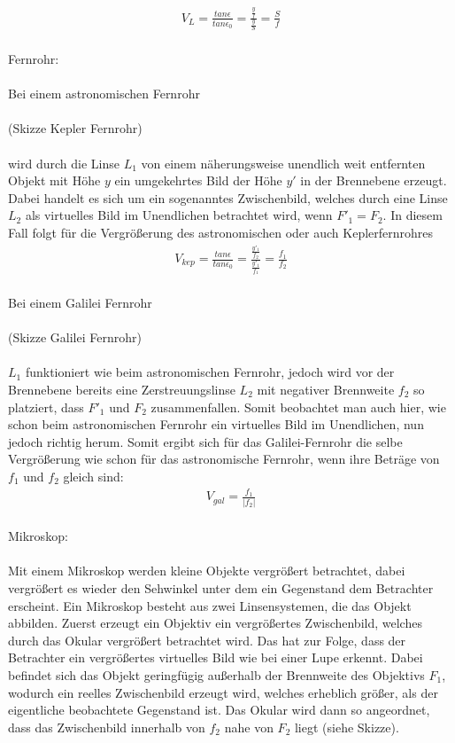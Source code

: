 \documentclass[a4paper,10pt]{scrartcl}
\begin{document}
			\begin{align*}
			V_{L}=\frac{tan\epsilon}{tan\epsilon_{0}}=\frac{\frac{y}{f}}{\frac{y}{S}}=\frac{S}{f}
			\end{align*}
			\\
			Fernrohr:\\
			\\
			Bei einem astronomischen Fernrohr\\
			\\
			(Skizze Kepler Fernrohr)\\
			\\
			wird durch die Linse \(L_{1}\) von einem näherungsweise unendlich weit entfernten Objekt mit Höhe \(y\) ein umgekehrtes Bild der Höhe \(y'\) in der Brennebene erzeugt. Dabei handelt es sich um ein sogenanntes Zwischenbild, welches durch eine Linse \(L_{2}\) als virtuelles Bild im Unendlichen betrachtet wird, wenn \(F'_{1}=F_{2}\). In diesem Fall folgt für die Vergrößerung des astronomischen oder auch Keplerfernrohres
			\begin{align*}
			V_{kep}=\frac{tan\epsilon}{tan\epsilon_{0}}=\frac{\frac{y'_{1}}{f_{2}}}{\frac{y'_{1}}{f_{1}}}=\frac{f_{1}}{f_{2}}
			\end{align*}
			\\
			Bei einem Galilei Fernrohr\\
			\\
			(Skizze Galilei Fernrohr)\\
			\\
			\(L_{1}\) funktioniert wie beim astronomischen Fernrohr, jedoch wird vor der Brennebene bereits eine Zerstreuungslinse \(L_{2}\) mit negativer Brennweite \(f_{2}\) so platziert, dass \(F'_{1}\) und \(F_{2}\) zusammenfallen. Somit beobachtet man auch hier, wie schon beim astronomischen Fernrohr ein virtuelles Bild im Unendlichen, nun jedoch richtig herum. Somit ergibt sich für das Galilei-Fernrohr die selbe Vergrößerung wie schon für das astronomische Fernrohr, wenn ihre Beträge von \(f_{1}\) und \(f_{2}\) gleich sind:
			\begin{align*}
			V_{gal}=\frac{f_{1}}{|f_{2}|}
			\end{align*}
			\\
			Mikroskop:\\
			\\
			Mit einem Mikroskop werden kleine Objekte vergrößert betrachtet, dabei vergrößert es wieder den Sehwinkel unter dem ein Gegenstand dem Betrachter erscheint. Ein Mikroskop besteht aus zwei Linsensystemen, die das Objekt abbilden. Zuerst erzeugt ein Objektiv ein vergrößertes Zwischenbild, welches durch das Okular vergrößert betrachtet wird. Das hat zur Folge, dass der Betrachter ein vergrößertes virtuelles Bild wie bei einer Lupe erkennt. Dabei befindet sich das Objekt geringfügig außerhalb der Brennweite des Objektivs \(F_{1}\), wodurch ein reelles Zwischenbild erzeugt wird, welches erheblich größer, als der eigentliche beobachtete Gegenstand ist. Das Okular wird dann so angeordnet, dass das Zwischenbild innerhalb von \(f_{2}\) nahe von \(F_{2}\) liegt (siehe Skizze).\\
\end{document}
